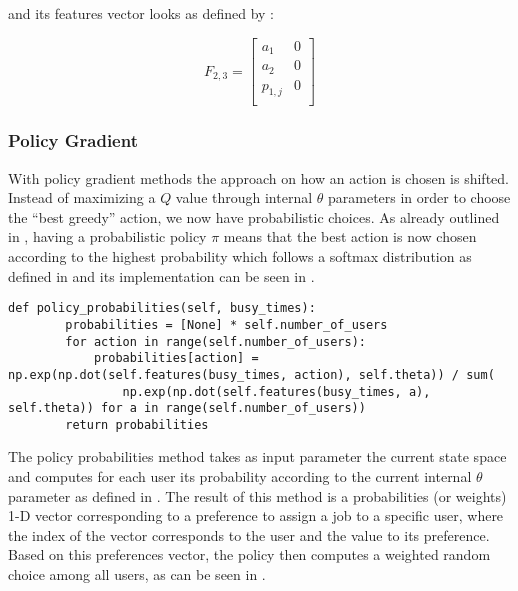 \documentclass{seal_thesis}
\begin{document}
and its features vector looks as defined by :

\begin{equation}
\label{eq:kbatch_features_ex}
	F_{2,3} = 
	\begin{bmatrix}
	a_1 & 0 \\
	a_2 & 0 \\
	p_{1,j} & 0 \\
	\end{bmatrix}
\end{equation}

\subsubsection{Policy Gradient}

With policy gradient methods the approach on how an action is chosen is shifted. Instead of maximizing a $Q$ value through internal $\theta$ parameters in order to choose the ``best greedy'' action, we now have probabilistic choices. As already outlined in , having a probabilistic policy $\pi$ means that the best action is now chosen according to the highest probability which follows a softmax distribution as defined in  and its implementation can be seen in .

\begin{lstlisting}[caption=Softmax distribution of preferences probabilities,label=lst:softmax_probabilities,style=CustomPython]
    def policy_probabilities(self, busy_times):
        probabilities = [None] * self.number_of_users
        for action in range(self.number_of_users):
            probabilities[action] = np.exp(np.dot(self.features(busy_times, action), self.theta)) / sum(
                np.exp(np.dot(self.features(busy_times, a), self.theta)) for a in range(self.number_of_users))
        return probabilities
\end{lstlisting}

The policy probabilities method takes as input parameter the current state space and computes for each user its probability according to the current internal $\theta$ parameter as defined in . The result of this method is a probabilities (or weights) 1-D vector corresponding to a preference to assign a job to a specific user, where the index of the vector corresponds to the user and the value to its preference. Based on this preferences vector, the policy then computes a weighted random choice among all users, as can be seen in .
\end{document}
